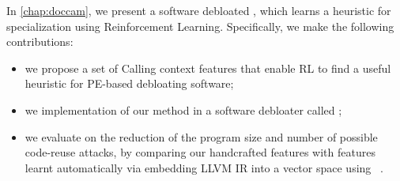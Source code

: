 
In \cref{chap:doccam}, we present a software debloated \doccam, which learns a heuristic for specialization using Reinforcement Learning. Specifically, we make the following contributions: 
\begin{itemize}
    \item we propose a set of Calling context features that enable RL to find a useful heuristic for PE-based debloating software;
    \item we implementation of our method in a software debloater called \doccam;
    \item we evaluate on the reduction of the
program size and number of possible code-reuse attacks, by comparing
our handcrafted features with features learnt automatically via
embedding LLVM IR into a vector space using \insttovec~\cite{inst2vec}.
\end{itemize}
